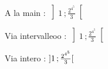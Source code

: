 \documentclass[a4paper,10pt]{article}
\newcommand{\inter}[4]
    {\mathchoice
    {\left#1#2\mathclose{}\mathpunct{};#3\right#4}%
    {\mathopen{#1}#2\mathclose{}\mathpunct{};#3\mathclose{#4}}%
    {\mathopen{#1}#2\mathclose{}\mathpunct{};#3\mathclose{#4}}%
    {\mathopen{#1}#2\mathclose{}\mathpunct{};#3\mathclose{#4}}%
    }
\newcommand{\interoo }[2]{\ensuremath{\inter{]}{#1}{#2}{[}}} %
\newcommand{\intervalleoo}[2]{ \left] #1\,;#2 \right[ }
\begin{document}
    A la main : $\left] 1\, ; \frac{2^{4^5}}{3} \right[$

    Via intervalleoo : $\intervalleoo{1}{ \frac{2^{4^5}}{3} }$

    Via intero : $\interoo{1}{ \frac{2^{4^5}}{3} }$
\end{document}
